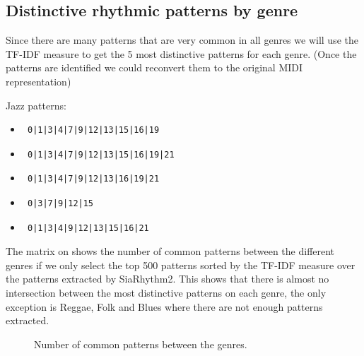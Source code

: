 \documentclass{article}
\begin{document}
\subsection{Distinctive rhythmic patterns by genre}

Since there are many patterns that are very common in all genres we will use the TF-IDF measure to get the 5 most distinctive patterns for each genre. (Once the patterns are identified we could reconvert them to the original MIDI representation)

Jazz patterns:
\begin{itemize}
\item \begin{verbatim} 0|1|3|4|7|9|12|13|15|16|19\end{verbatim}
\item \begin{verbatim} 0|1|3|4|7|9|12|13|15|16|19|21 \end{verbatim}
\item \begin{verbatim} 0|1|3|4|7|9|12|13|16|19|21 \end{verbatim}
\item \begin{verbatim} 0|3|7|9|12|15 \end{verbatim}
\item \begin{verbatim} 0|1|3|4|9|12|13|15|16|21 \end{verbatim}
\end{itemize}

The matrix on  shows the number of common patterns between the different genres if we only select the top 500 patterns sorted by the TF-IDF measure over the patterns extracted by SiaRhythm2. This shows that there is almost no intersection between the most distinctive patterns on each genre, the only exception is Reggae, Folk and Blues where there are not enough patterns extracted. 

\begin{figure}
 \centerline{}
 \caption{Number of common patterns between the genres.}
 \label{confusiongenres}
\end{figure}
\end{document}

